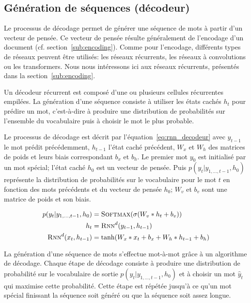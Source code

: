 \subsection{Génération de séquences (décodeur)}
\label{sub:decoding}

Le processus de décodage permet de générer une séquence de mots à partir d'un vecteur de pensée. Ce vecteur de pensée résulte généralement de l'encodage d'un document (cf. section~\ref{sub:encoding}).
Comme pour l'encodage, différents types de réseaux peuvent être utilisés: les réseaux récurrents, les réseaux à convolutions ou les transformers.
Nous nous intéressons ici aux réseaux récurrents, présentés dans la section~\ref{sub:encoding}.

Un décodeur récurrent est composé d'une ou plusieurs cellules récurrentes empilées.
La génération d'une séquence consiste à utiliser les états cachés $h_t$ pour prédire un mot, c'est-à-dire à produire une distribution de probabilités sur l'ensemble du vocabulaire puis à choisir le mot le plus probable.


Le processus de décodage est décrit par l'équation~\ref{eq:rnn_decodeur} avec $y_{t-1}$ le mot prédit précédemment, $h_{t-1}$ l'état caché précédent, $W_x$ et $W_h$ des matrices de poids et leurs biais correspondant $b_x$ et $b_h$.
Le premier mot $y_0$ est initialisé par un mot spécial; l'état caché $h_0$ est un vecteur de pensée.
Puis $p(y_t | y_{1,...,t-1},h_0)$ représente la distribution de probabilités sur le vocabulaire pour le mot $t$ en fonction des mots précédents et du vecteur de pensée $h_0$; $W_v$ et $b_v$ sont une matrice de poids et son biais.


\begin{equation} \label{eq:rnn_decodeur}
\begin{split}
    p(y_t | y_{1,...,t-1},h_0) & = \textsc{Softmax}(\sigma(W_v * h_t + b_v))\\
    h_t & = \textsc{Rnn}^d(y_{t-1}, h_{t-1}) \\
    \textsc{Rnn}^d(x_t, h_{t-1}) & = \text{tanh}(W_x * x_t + b_x + W_h * h_{t-1} + b_h)
\end{split}
\end{equation}

La génération d'une séquence de mots s'effectue mot-à-mot grâce à un algorithme de décodage.
Chaque étape de décodage consiste à produire une distribution de probabilité sur le vocabulaire de sortie $p(y_t | y_{1,...,t-1},h_0)$ et à choisir un mot $\hat{y}_t$ qui maximise cette probabilité.
Cette étape est répétée jusqu'à ce qu'un mot spécial finissant la séquence soit généré ou que la séquence soit assez longue.

